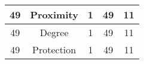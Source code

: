 \documentclass[results.tex]{subfiles}
\begin{document}
\begin{center}
\begin{tabular}{| c || c | c | c | c |}
            \hline
            49                      & Proximity                    & 1                      & 49                      & 11                   \\
            \hline
            49                      & Degree                       & 1                      & 49                      & 11                   \\
            \hline
            49                      & Protection                   & 1                      & 49                      & 11                   \\
            \hline
        \end{tabular}
    \end{center}
\end{document}
